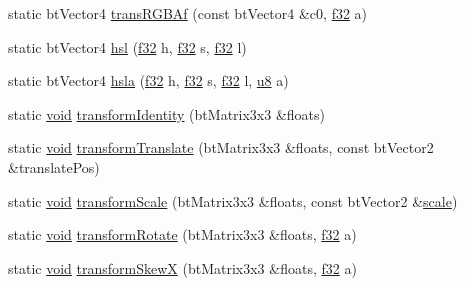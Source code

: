 \begin{DoxyCompactItemize}
\item 
static bt\+Vector4 \mbox{\hyperlink{classnjli_1_1_world_h_u_d_a6b41d149bb7c30b7a2cb0d49c23d35ab}{trans\+R\+G\+B\+Af}} (const bt\+Vector4 \&c0, \mbox{\hyperlink{_util_8h_a5f6906312a689f27d70e9d086649d3fd}{f32}} a)
\item 
static bt\+Vector4 \mbox{\hyperlink{classnjli_1_1_world_h_u_d_aa8eef5943b4d463a8567351856430131}{hsl}} (\mbox{\hyperlink{_util_8h_a5f6906312a689f27d70e9d086649d3fd}{f32}} h, \mbox{\hyperlink{_util_8h_a5f6906312a689f27d70e9d086649d3fd}{f32}} s, \mbox{\hyperlink{_util_8h_a5f6906312a689f27d70e9d086649d3fd}{f32}} l)
\item 
static bt\+Vector4 \mbox{\hyperlink{classnjli_1_1_world_h_u_d_abdb6027ff19dfffaf2c93870fa8f0902}{hsla}} (\mbox{\hyperlink{_util_8h_a5f6906312a689f27d70e9d086649d3fd}{f32}} h, \mbox{\hyperlink{_util_8h_a5f6906312a689f27d70e9d086649d3fd}{f32}} s, \mbox{\hyperlink{_util_8h_a5f6906312a689f27d70e9d086649d3fd}{f32}} l, \mbox{\hyperlink{_util_8h_aed742c436da53c1080638ce6ef7d13de}{u8}} a)
\item 
static \mbox{\hyperlink{_thread_8h_af1e856da2e658414cb2456cb6f7ebc66}{void}} \mbox{\hyperlink{classnjli_1_1_world_h_u_d_ac7c83a1711e1dd159cb726413a23d690}{transform\+Identity}} (bt\+Matrix3x3 \&floats)
\item 
static \mbox{\hyperlink{_thread_8h_af1e856da2e658414cb2456cb6f7ebc66}{void}} \mbox{\hyperlink{classnjli_1_1_world_h_u_d_abc1f08b9511cee6d0642bcb2aac75ce0}{transform\+Translate}} (bt\+Matrix3x3 \&floats, const bt\+Vector2 \&translate\+Pos)
\item 
static \mbox{\hyperlink{_thread_8h_af1e856da2e658414cb2456cb6f7ebc66}{void}} \mbox{\hyperlink{classnjli_1_1_world_h_u_d_a3bfccd760729d7c98a7e9e623cbcedc7}{transform\+Scale}} (bt\+Matrix3x3 \&floats, const bt\+Vector2 \&\mbox{\hyperlink{classnjli_1_1_world_h_u_d_a7db32bf294c4d55958d43188457bd866}{scale}})
\item 
static \mbox{\hyperlink{_thread_8h_af1e856da2e658414cb2456cb6f7ebc66}{void}} \mbox{\hyperlink{classnjli_1_1_world_h_u_d_a1bbc160b9aeb8c7706993f8656fe1d13}{transform\+Rotate}} (bt\+Matrix3x3 \&floats, \mbox{\hyperlink{_util_8h_a5f6906312a689f27d70e9d086649d3fd}{f32}} a)
\item 
static \mbox{\hyperlink{_thread_8h_af1e856da2e658414cb2456cb6f7ebc66}{void}} \mbox{\hyperlink{classnjli_1_1_world_h_u_d_a90c3fce67d0ee9de281a6411aa2a10da}{transform\+SkewX}} (bt\+Matrix3x3 \&floats, \mbox{\hyperlink{_util_8h_a5f6906312a689f27d70e9d086649d3fd}{f32}} a)
\item 

\end{DoxyCompactItemize}
